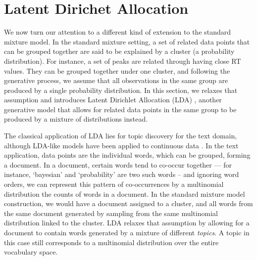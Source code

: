 \section{Latent Dirichet Allocation\label{background-lda}}

We now turn our attention to a different kind of extension to the standard mixture model. In the standard mixture setting, a set of related data points that can be grouped together are said to be explained by a cluster (a probability distribution). For instance, a set of peaks are related through having close RT values. They can be grouped together under one cluster, and following the generative process, we assume that all observations in the same group are produced by a single probability distribution. In this section, we relaxes that assumption and introduces Latent Dirichlet Allocation (LDA) \cite{Blei2003}, another generative model that allows for related data points in the same group to be produced by a mixture of distributions instead.

The classical application of LDA lies for topic discovery for the text domain, although LDA-like models have been applied to continuous data \cite{rogers2005latent,weinshall2013lda,das2015gaussian}. In the text application, data points are the individual words, which can be grouped, forming a document. In a document, certain words tend to co-occur together --- for instance, `bayesian' and `probability' are two such words -- and ignoring word orders, we can represent this pattern of co-occurrences by a multinomial distribution the counts of words in a document. In the standard mixture model construction, we would have a document assigned to a cluster, and all words from the same document generated by sampling from the same multinomial distribution linked to the cluster. LDA relaxes that assumption by allowing for a document to contain words generated by a mixture of different \emph{topics}. A topic in this case still corresponds to a multinomial distribution over the entire vocabulary space.

